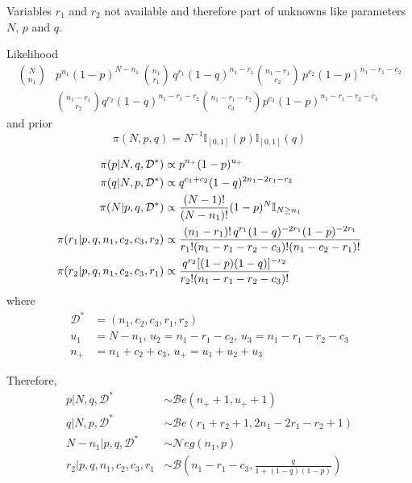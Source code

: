 \begin{slide}
\vs Variables $r_1$ and $r_2$ not available and therefore part of unknowns like
parameters $N$, $p$ and $q$.

\end{slide}\begin{slide}
Likelihood 
\small
\begin{align*}
{N\choose n_1}&p^{n_1}(1-p)^{N-n_1}\,{n_1\choose r_1}\,q^{r_1}(1-q)^{n_1-r_1}{n_1-r_1\choose c_2}\,p^{c_2}(1-p)^{n_1-r_1-c_2}\\
&{n_1-r_1\choose r_2} q^{r_2}(1-q)^{n_1-r_1-r_2}{n_1-r_1-r_2\choose c_3} p^{c_3}(1-p)^{n_1-r_1-r_2-c_3}
\end{align*}\normalsize
and prior 
$$
\pi(N,p,q)=N^{-1}\mathbb{I}_{[0,1]}(p)\mathbb{I}_{[0,1]}(q)
$$

\end{slide}\begin{slide}

\begin{align*}
\pi(p|N,q,\mathcal{D}^*) &\propto p^{n_+} (1-p)^{u_+}\\
\pi(q|N,p,\mathcal{D}^*) &\propto q^{c_1+c_2}(1-q)^{2n_1-2r_1-r_2}\\
\pi(N|p,q,\mathcal{D}^*) &\propto {(N-1)! \over (N-n_1)!} (1-p)^N \mathbb{I}_{N\ge n_1}\\
\pi(r_1|p,q,n_1,c_2,c_3,r_2) &\propto \frac{(n_1-r_1)!\,q^{r_1}(1-q)^{-2r_1}(1-p)^{-2r_1}}{
        r_1!(n_1-r_1-r_2-c_3)!(n_1-c_2-r_1)!}\\
\pi(r_2|p,q,n_1,c_2,c_3,r_1) &\propto \frac{q^{r_2}[(1-p)(1-q)]^{-r_2}}{
        r_2!(n_1-r_1-r_2-c_3)!}
\end{align*}
where 
\small
\begin{align*}
\mathcal{D}^*&=(n_1,c_2,c_3,r_1,r_2)\\
u_1&=N-n_1,\,u_2=n_1-r_1-c_2,\,u_3=n_1-r_1-r_2-c_3\\
n_+&=n_1+c_2+c_3,\,u_+=u_1+u_2+u_3
\end{align*}

\end{slide}\begin{slide}
\normalsize
Therefore,
\begin{align*}
p|N,q,\mathcal{D}^* &\sim \mathcal{B}e(n_++1, u_++1) \\
q|N,p,\mathcal{D}^* &\sim \mathcal{B}e(r_1+r_2+1, 2n_1-2r_1-r_2+1) \\
N-n_1|p,q,\mathcal{D}^* &\sim \mathcal{N}eg(n_1,p)\\
r_2|p,q,n_1,c_2,c_3,r_1 &\sim \mathcal{B}\left(n_1-r_1-c_3,\frac{q}{1+(1-q)(1-p)}\right)
\end{align*}


\end{slide}
